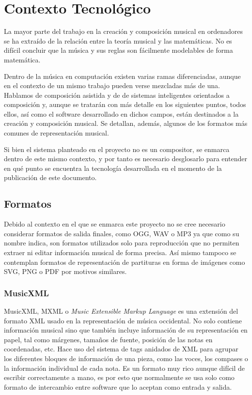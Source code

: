 \section{Contexto Tecnológico}
\minitoc
\label{chap:contexto-tecnologico}

La mayor parte del trabajo en la creación y composición musical en ordenadores se ha extraído de la relación entre la teoría musical y las matemáticas. No es difícil concluir que la música y sus reglas son fácilmente modelables de forma matemática. 

Dentro de la música en computación existen varias ramas diferenciadas, aunque en el contexto de un mismo trabajo pueden verse mezcladas más de una. Hablamos de composición asistida y de de sistemas inteligentes orientados a composición y, aunque se tratarán con más detalle en los siguientes puntos, todos ellos, así como el software desarrollado en dichos campos, están destinados a la creación y composición musical. Se detallan, además, algunos de los formatos más comunes de representación musical.

Si bien el sistema planteado en el proyecto no es un compositor, se enmarca dentro de este mismo contexto, y por tanto es necesario desglosarlo para entender en qué punto se encuentra la tecnología desarrollada en el momento de la publicación de este documento.

\subsection{Formatos}
Debido al contexto en el que se enmarca este proyecto no se cree necesario considerar formatos de salida finales, como OGG, WAV o MP3 ya que como su nombre indica, son formatos utilizados solo para reproducción que no permiten extraer ni editar información musical de forma precisa. Así mismo tampoco se contemplan formatos de representación de partituras en forma de imágenes como SVG, PNG o PDF por motivos similares.

\subsubsection{MusicXML}
MusicXML, MXML o \textit{Music Extensible Markup Language} es una extensión del formato XML usado en la representación de música occidental. No solo contiene información musical sino que también incluye información de su representación en papel, tal como márgenes, tamaños de fuente, posición de las notas en coordenadas, etc. Hace uso del sistema de tags anidados de XML para agrupar los diferentes bloques de información de una pieza, como las voces, los compases o la información individual de cada nota. Es un formato muy rico aunque difícil de escribir correctamente a mano, es por esto que normalmente se usa solo como formato de intercambio entre software que lo aceptan como entrada y salida.

